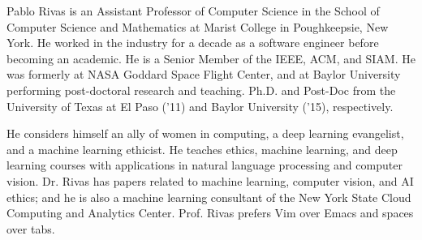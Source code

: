 \documentclass[conference]{IEEEtran}
\begin{document}
\begin{IEEEbiography}{Pablo Rivas}
is an Assistant Professor of Computer Science in the School of Computer Science and Mathematics at Marist College in Poughkeepsie, New York.  He worked in the industry for a decade as a software engineer before becoming an academic. He is a Senior Member of the IEEE, ACM, and SIAM. He was formerly at NASA Goddard Space Flight Center, and at Baylor University performing post-doctoral research and teaching. Ph.D. and Post-Doc from the University of Texas at El Paso ('11) and Baylor University ('15), respectively.

He considers himself an ally of women in computing, a deep learning evangelist, and a machine learning ethicist. He teaches ethics, machine learning, and deep learning courses with applications in natural language processing and computer vision. Dr. Rivas has papers related to machine learning, computer vision, and AI ethics; and he is also a machine learning consultant of the New York State Cloud Computing and Analytics Center. Prof. Rivas prefers Vim over Emacs and spaces over tabs.
\end{IEEEbiography}
\end{document}
